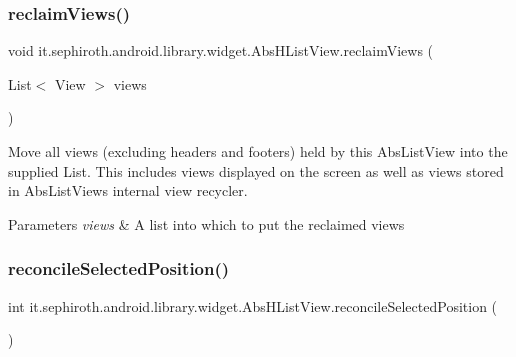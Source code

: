 \subsubsection{\texorpdfstring{reclaim\+Views()}{reclaimViews()}}
{\footnotesize\ttfamily void it.\+sephiroth.\+android.\+library.\+widget.\+Abs\+H\+List\+View.\+reclaim\+Views (\begin{DoxyParamCaption}\item[{List$<$ View $>$}]{views }\end{DoxyParamCaption})}

Move all views (excluding headers and footers) held by this Abs\+List\+View into the supplied List. This includes views displayed on the screen as well as views stored in Abs\+List\+View\textquotesingle{}s internal view recycler.


\begin{DoxyParams}{Parameters}
{\em views} & A list into which to put the reclaimed views \\
\hline
\end{DoxyParams}
\mbox{\label{classit_1_1sephiroth_1_1android_1_1library_1_1widget_1_1_abs_h_list_view_ae85c1fa753583741abee13542743cef7}} 
\subsubsection{\texorpdfstring{reconcile\+Selected\+Position()}{reconcileSelectedPosition()}}
{\footnotesize\ttfamily int it.\+sephiroth.\+android.\+library.\+widget.\+Abs\+H\+List\+View.\+reconcile\+Selected\+Position (\begin{DoxyParamCaption}{ }\end{DoxyParamCaption})\hspace{0.3cm}{\ttfamily [protected]}}


